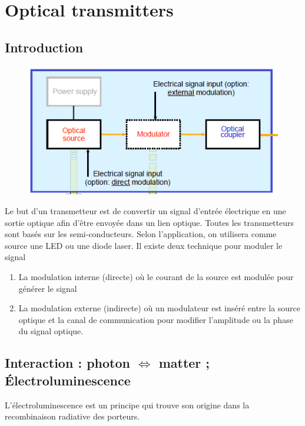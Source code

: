 \chapter{Optical transmitters}
\section{Introduction}
	\begin{figure}
	\includegraphics[scale=0.6]{ch4/image1}
	\end{figure}
Le but d'un transmetteur est de convertir un signal d'entrée électrique en une sortie optique
afin d'être envoyée dans un lien optique. Toutes les transmetteurs sont basés sur les semi-conducteurs. 
Selon l'application, on utilisera comme source une LED ou une diode laser. Il existe deux technique pour moduler le signal
\begin{enumerate}
\item La modulation interne (directe) où le courant de la source est modulée pour générer le signal
\item La modulation externe (indirecte) où un modulateur est inséré entre la source optique et la canal
de communication pour modifier l'amplitude ou la phase du signal optique.
\end{enumerate}


\section{Interaction : photon $\Leftrightarrow$ matter ; Électroluminescence}
L'électroluminescence est un principe qui trouve son origine dans la recombinaison radiative des 
porteurs.

